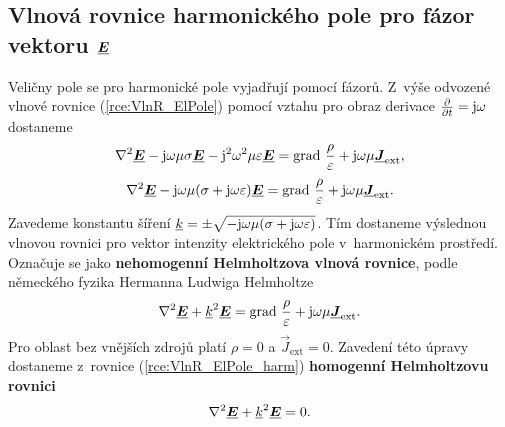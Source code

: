 \subsection*{Vlnová rovnice harmonického pole pro fázor vektoru $\mbox{\underline{\boldmath$E$}}$}
Veličny pole se pro harmonické pole vyjadřují pomocí fázorů. Z~výše odvozené vlnové rovnice (\ref{rce:VlnR_ElPole}) pomocí vztahu pro obraz derivace $\frac{\partial}{\partial t}=\mathrm{j}\omega$ dostaneme
\begin{displaymath}
	\nabla^{2}\mbox{\underline{\boldmath$E$}} -\mathrm{j}\omega\mu\sigma\mbox{\underline{\boldmath$E$}}-\mathrm{j}^{2}\omega ^{2}\mu\varepsilon\mbox{\underline{\boldmath$E$}} = \mathrm{grad}\ \frac{\rho}{\varepsilon}+\mathrm{j}\omega\mu\mbox{\underline{\boldmath$J$}}_{\mathrm{ext}},
\end{displaymath}
\begin{displaymath}
	\nabla^{2}\mbox{\underline{\boldmath$E$}} -\mathrm{j}\omega\mu(\sigma+\mathrm{j}\omega\varepsilon)\mbox{\underline{\boldmath$E$}} = \mathrm{grad}\ \frac{\rho}{\varepsilon}+ \mathrm{j}\omega\mu\mbox{\underline{\boldmath$J$}}_{\mathrm{ext}}.
\end{displaymath}
Zavedeme konstantu šíření ${\underline{k}}=\pm\sqrt{-\mathrm{j}\omega\mu(\sigma+\mathrm{j}\omega\varepsilon)}$. Tím dostaneme výslednou vlnovou rovnici pro vektor intenzity elektrického pole v~harmonickém prostředí. Označuje se jako {\bf nehomogenní Helmholtzova vlnová rovnice}, podle německého fyzika Hermanna Ludwiga Helmholtze
\begin{equation}
	\nabla^{2}\mbox{\underline{\boldmath$E$}} +{\underline{k}}^{2}\mbox{\underline{\boldmath$E$}} = \mathrm{grad}\ \frac{\rho}{\varepsilon}+ \mathrm{j}\omega\mu\mbox{\underline{\boldmath$J$}}_{\mathrm{ext}}.
	\label{rce:VlnR_ElPole_harm} 
\end{equation}
Pro oblast bez vnějších zdrojů platí $\rho = 0$ a $\vec J_{\mathrm{ext}} = 0$. Zavedení této úpravy dostaneme z~rovnice (\ref{rce:VlnR_ElPole_harm}) {\bf homogenní Helmholtzovu rovnici}
\begin{equation}
	\nabla^{2}\mbox{\underline{\boldmath$E$}} +{\underline{k}}^{2}\mbox{\underline{\boldmath$E$}} = 0.
	\label{rce:VlnR_ElPole_harm_BezZdroju} 
\end{equation}

